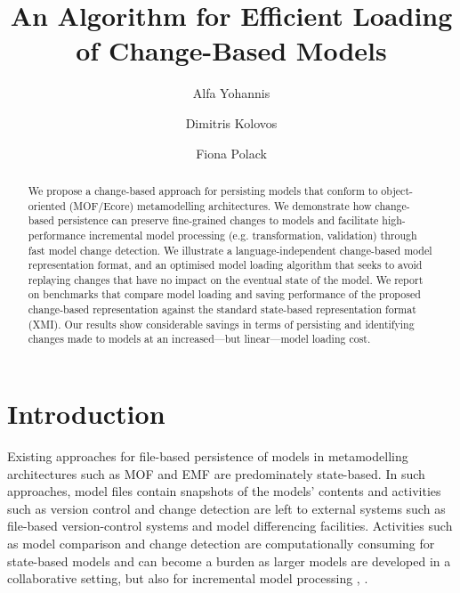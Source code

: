 \documentclass{llncs}
\begin{document}
\renewcommand{\thelstlisting}{\arabic{lstlisting}}
\renewcommand{\labelitemi}{$\bullet$}
\newcommand{\dk}[1]{\textbf{[DK: #1]}}

\title{An Algorithm for Efficient Loading \\ of Change-Based Models}
%
%
\author{Alfa Yohannis \and Dimitris Kolovos \and Fiona Polack }
%
%
%

\maketitle              %

\begin{abstract}
We propose a change-based approach for persisting models that conform to object-oriented (MOF/Ecore) metamodelling architectures. We demonstrate how change-based persistence can preserve fine-grained changes to models and facilitate high-performance incremental model processing (e.g. transformation, validation) through fast model change detection. We illustrate a language-independent change-based model representation format, and an optimised model loading algorithm that seeks to avoid replaying changes that have no impact on the eventual state of the model. We report on benchmarks that compare model loading and saving performance of the proposed change-based representation against the standard state-based representation format (XMI). Our results show considerable savings in terms of persisting and identifying changes made to models at an increased---but linear---model loading cost.
\end{abstract}

\section{Introduction}
\label{sec:introduction}
Existing approaches for file-based persistence of models in metamodelling architectures such as MOF and EMF are predominately state-based. In such approaches, model files contain snapshots of the models' contents and activities such as version control and change detection are left to external systems such as file-based version-control systems and model differencing facilities. Activities such as model comparison and change detection are computationally consuming for state-based models and can become a burden as larger models are developed in a collaborative setting, but also for incremental model processing \cite{rath2012derived}, \cite{ogunyomi2015property}. 
\end{document}
